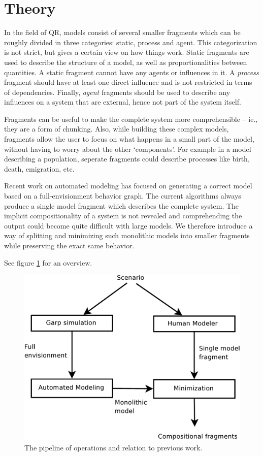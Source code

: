 \documentclass{article} %
\begin{document}
\section{Theory}
\label{sec:theory}
In the field of QR, models %
consist of several smaller fragments which can be roughly divided in three
categories: static, process and agent. This categorization is not strict, but
gives a certain view on how things work. Static fragments are used to describe
the structure of a model, as well as proportionalities between quantities. A
static fragment cannot have any agents or influences in it. A \emph{process}
fragment should have at least one direct influence and is not restricted in
terms of dependencies. %
Finally, \emph{agent} fragments should be used to describe any influences on a
system that are external, hence not part of the system itself.

Fragments can be useful to make the complete system more comprehensible --
ie., they are a form of chunking.  Also, while building these complex models,
fragments allow the user to focus on what happens in a small part of the
model, without having to worry about the other `components'. For example in a
model describing a population, seperate fragments could describe processes
like birth, death, emigration, etc.

Recent work on automated modeling \cite{buisman, liem, vanweelden} has focused
on generating a correct model based on a full-envisionment behavior graph. The
current algorithms always produce a single model fragment which describes the
complete system. The implicit compositionality of a system is not revealed and
comprehending the output could become quite difficult with large models. We
therefore introduce a way of splitting and minimizing such monolithic models
into smaller fragments while preserving the exact same behavior.

See figure \ref{pipeline} for an overview. %

\begin{figure}[ht]
\centering
\includegraphics[scale=0.5]{pipeline-crop.pdf}
\caption{The pipeline of operations and relation to previous work.}
\label{pipeline}
\end{figure}
\end{document}
